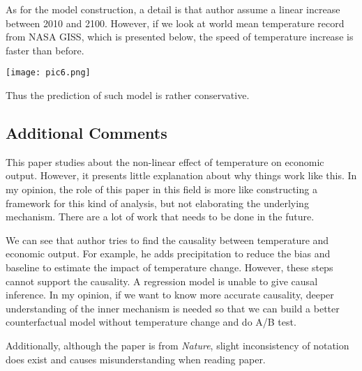 \documentclass[letterpaper]{article}
\begin{document}
As for the model construction, a detail is that author assume a linear increase between 2010 and 2100. However, if we look at world mean temperature record from NASA GISS, which is presented below, the speed of temperature increase is faster than before.
\begin{center}
  \texttt{[image: pic6.png]}
\end{center}
Thus the prediction of such model is rather conservative. 

\subsection{Additional Comments}

This paper studies about the non-linear effect of temperature on economic output. However, it presents little explanation about why things work like this. In my opinion, the role of this paper in this field is more like constructing a framework for this kind of analysis, but not elaborating the underlying mechanism. There are a lot of work that needs to be done in the future.

We can see that author tries to find the causality between temperature and economic output. For example, he adds precipitation to reduce the bias and baseline to estimate the impact of temperature change. However, these steps cannot support the causality. A regression model is unable to give causal inference. In my opinion, if we want to know more accurate causality, deeper understanding of the inner mechanism is needed so that we can build a better counterfactual model without temperature change and do A/B test.

Additionally, although the paper is from \textit{Nature}, slight inconsistency of notation does exist and causes misunderstanding when reading paper.



\end{document}

